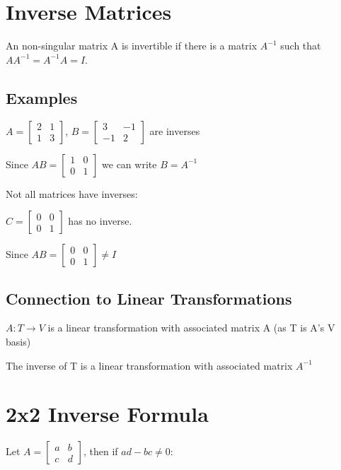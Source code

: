 \documentclass[12pt,a4paper]{article}
\begin{document}
\section{Inverse Matrices}

An non-singular matrix A is invertible if there is a matrix $A^{-1}$ such that $AA^{-1} = A^{-1}A = I$.

\subsection{Examples}

$A = \begin{bmatrix} 2 & 1 \\ 1 & 3 \end{bmatrix}$, $B = \begin{bmatrix} 3 & -1 \\ -1 & 2 \end{bmatrix}$ are inverses

Since $AB = \begin{bmatrix} 1 & 0 \\ 0 & 1 \end{bmatrix}$ we can write $B = A^{-1}$

Not all matrices have inverses:

$C = \begin{bmatrix} 0 & 0 \\ 0 & 1 \end{bmatrix}$ has no inverse.

Since $AB = \begin{bmatrix} 0 & 0 \\ 0 & 1 \end{bmatrix} \neq I$

\subsection{Connection to Linear Transformations}

$A: T \rightarrow V$ is a linear transformation with associated matrix A (as T is A's V basis)

The inverse of T is a linear transformation with associated matrix $A^{-1}$

\section{2x2 Inverse Formula}

Let $A = \begin{bmatrix} a & b \\ c & d \end{bmatrix}$, then if $ad-bc \neq 0$:
\end{document}

